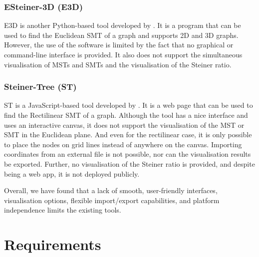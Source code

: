 \documentclass{l4proj}
\begin{document}
\subsection{ESteiner-3D (E3D)}
E3D is another Python-based tool developed by \cite{ESteiner-3D}. It is a program that can be used to find the Euclidean SMT of a graph and supports 2D and 3D graphs. However, the use of the software is limited by the fact that no graphical or command-line interface is provided. It also does not support the simultaneous visualisation of MSTs and SMTs and the visualisation of the Steiner ratio.

\subsection{Steiner-Tree (ST)}
ST is a JavaScript-based tool developed by \cite{Steiner-Tree}. It is a web page that can be used to find the Rectilinear SMT of a graph. Although the tool has a nice interface and uses an interactive canvas, it does not support the visualisation of the MST or SMT in the Euclidean plane. And even for the rectilinear case, it is only possible to place the nodes on grid lines instead of anywhere on the canvas. Importing coordinates from an external file is not possible, nor can the visualisation results be exported. Further, no visualisation of the Steiner ratio is provided, and despite being a web app, it is not deployed publicly.

Overall, we have found that a lack of smooth, user-friendly interfaces, visualisation options, flexible import/export capabilities, and platform independence limits the existing tools.

\chapter{Requirements}
\label{sec:requirements}
\end{document}
